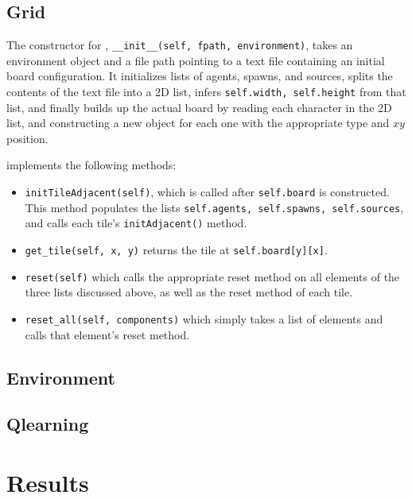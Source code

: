 \documentclass[11pt]{article}
\begin{document}
\subsection{Grid}

The constructor for , \texttt{__init__(self, fpath, environment)}, takes an environment object and a file path pointing to a text file containing an initial board configuration. It initializes lists of agents, spawns, and sources, splits the contents of the text file into a 2D list, infers \texttt{self.width, self.height} from that list, and finally builds up the actual board by reading each character in the 2D list, and constructing a new  object for each one with the appropriate type and $xy$ position.

 implements the following methods:

\begin{itemize}
\item \texttt{initTileAdjacent(self)}, which is called after \texttt{self.board} is constructed. This method populates the lists \texttt{self.agents, self.spawns, self.sources}, and calls each tile's \texttt{initAdjacent()} method.
\item \texttt{get_tile(self, x, y)} returns the tile at \texttt{self.board[y][x]}.
\item \texttt{reset(self)} which calls the appropriate reset method on all elements of the three lists discussed above, as well as the reset method of each tile.
\item \texttt{reset_all(self, components)} which simply takes a list of elements and calls that element's reset method.
\end{itemize}

\subsection{Environment}

\subsection{Qlearning}



\section{Results}
\end{document}
